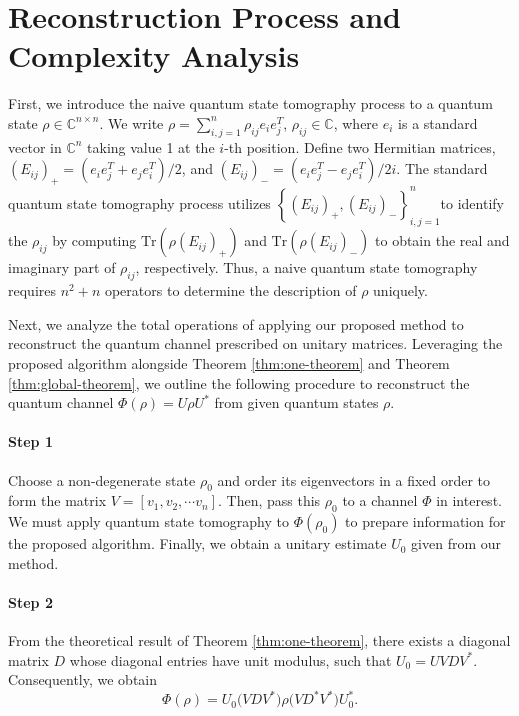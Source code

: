 \documentclass[sn-mathphys-num]{sn-jnl}%
\theoremstyle{thmstyleone}%
\theoremstyle{thmstyletwo}%
\theoremstyle{thmstylethree}%
\begin{document}
%
%

\section{Reconstruction Process and Complexity Analysis}
First, we introduce the naive quantum state tomography process to a quantum state $\rho\in \mathbb{C}^{n\times n}$. We write $\rho = \sum_{i,j= 1}^n \rho_{ij} e_i e_j^T$, $\rho_{ij} \in \mathbb{C}$, where $e_i$ is a standard vector in $\mathbb{C}^n$ taking value 1 at the $i$-th position.
Define two Hermitian matrices, $\left(E_{ij}\right)_+ = (e_i e_j^T+e_j e_i^T)/2$, and $\left(E_{ij}\right)_- = (e_i e_j^T-e_j e_i^T)/{2i}$. The standard quantum state tomography process utilizes $\left\{\left(E_{ij}\right)_+, \left(E_{ij}\right)_-\right\}_{i,j = 1}^n$to identify the  $\rho_{ij}$ by computing $\mbox{Tr}(\rho \left(E_{ij}\right)_+)$ and $\mbox{Tr}(\rho \left(E_{ij}\right)_-)$ to obtain the real and imaginary part of $\rho_{ij}$, respectively. Thus, a naive quantum state tomography requires $n^2+n$ operators to determine the description of $\rho$ uniquely.

Next, we analyze the total operations of applying our proposed method to reconstruct the quantum channel prescribed on unitary matrices. Leveraging the proposed algorithm alongside {Theorem \ref{thm:one-theorem} and Theorem \ref{thm:global-theorem}}, we outline the following procedure to reconstruct the quantum channel 
$\Phi(\rho) = U \rho U^*$ from given quantum states $\rho$.

\paragraph{Step 1}
Choose a non-degenerate state $\rho_0$ and order its eigenvectors in a fixed order to form the matrix $V = [v_1, v_2, \cdots v_n]$. Then, pass this $\rho_0$ to a channel $\Phi$ in interest. We must apply quantum state tomography to $\Phi(\rho_0)$ to prepare information for the proposed algorithm. Finally, we obtain a unitary estimate $U_0$ given from our method.

\paragraph{Step 2}
{
From the theoretical result of {Theorem} \ref{thm:one-theorem}, there exists a diagonal matrix $D$ whose diagonal entries have unit modulus, such that $U_0 = U V D V^*$. Consequently, we obtain  
\[
\Phi(\rho) = U_0 \bigl(V D V^*\bigr) \rho \bigl(V D^* V^*\bigr) U_0^*.
\]
}
\end{document}
